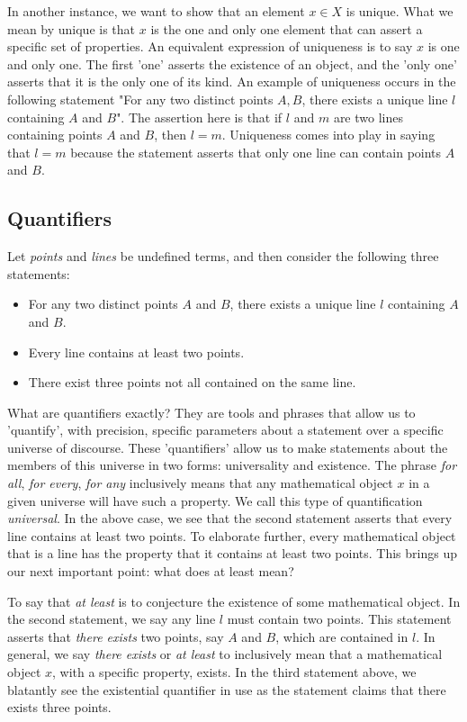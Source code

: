 \documentclass[12pt]{book}
\begin{document}
	In another instance, we want to show that an element $x\in X$ is unique. What we mean by unique is that $x$ is the one and only one element that can assert a specific set of properties. An equivalent expression of uniqueness is to say $x$ is one and only one. The first 'one' asserts the existence of an object, and the 'only one' asserts that it is the only one of its kind. An example of uniqueness occurs in the following statement "For any two distinct points $A,B$, there exists a unique line $l$ containing $A$ and $B$". The assertion here is that if $l$ and $m$ are two lines containing points $A$ and $B$, then $l=m$. Uniqueness comes into play in saying that $l=m$ because the statement asserts that only one line can contain points $A$ and $B$. 

\subsection*{Quantifiers}
Let \textit{points} and \textit{lines} be undefined terms, and then consider the following three statements:
\begin{itemize}
\item For any two distinct points $A$ and $B$, there exists a unique line $l$ containing $A$ and $B$.
\item Every line contains at least two points.
\item There exist three points not all contained on the same line.
\end{itemize}

	What are quantifiers exactly? They are tools and phrases that allow us to 'quantify', with precision, specific parameters about a statement over a specific universe of discourse. These 'quantifiers' allow us to make statements about the members of this universe in two forms: universality and existence. The phrase \textit{for all}, \textit{for every}, \textit{for any} inclusively means that any mathematical object $x$ in a given universe will have such a property. We call this type of quantification \textit{universal}. In the above case, we see that the second statement asserts that every line contains at least two points. To elaborate further, every mathematical object that is a line has the property that it contains at least two points. This brings up our next important point: what does at least mean?

	To say that \textit{at least} is to conjecture the existence of some mathematical object. In the second statement, we say any line $l$ must contain two points. This statement asserts that \textit{there exists} two points, say $A$ and $B$, which are contained in $l$. In general, we say \textit{there exists} or \textit{at least} to inclusively mean that a mathematical object $x$, with a specific property, exists. In the third statement above, we blatantly see the existential quantifier in use as the statement claims that there exists three points. 
	
\end{document}
